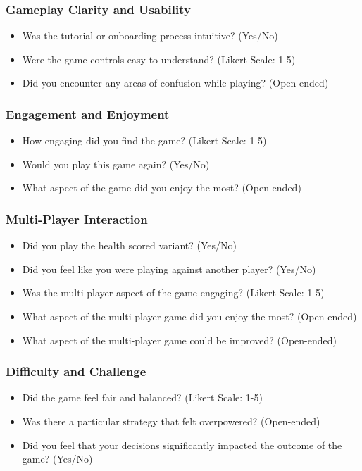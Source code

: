 \documentclass{article}
\begin{document}
\subsubsection{Gameplay Clarity and Usability}
\begin{itemize}
    \item Was the tutorial or onboarding process intuitive? (Yes/No)
    \item Were the game controls easy to understand? (Likert Scale: 1-5)
    \item Did you encounter any areas of confusion while playing? (Open-ended)
\end{itemize}

\subsubsection{Engagement and Enjoyment}
\begin{itemize}
    \item How engaging did you find the game? (Likert Scale: 1-5)
    \item Would you play this game again? (Yes/No)
    \item What aspect of the game did you enjoy the most? (Open-ended)
\end{itemize}

\subsubsection{Multi-Player Interaction}
\begin{itemize}
    \item Did you play the health scored variant? (Yes/No)
    \item Did you feel like you were playing against another player? (Yes/No)
    \item Was the multi-player aspect of the game engaging? (Likert Scale: 1-5)
    \item What aspect of the multi-player game did you enjoy the most? (Open-ended)
    \item What aspect of the multi-player game could be improved? (Open-ended)
\end{itemize}

\subsubsection{Difficulty and Challenge}
\begin{itemize}
    \item Did the game feel fair and balanced? (Likert Scale: 1-5)
    \item Was there a particular strategy that felt overpowered? (Open-ended)
    \item Did you feel that your decisions significantly impacted the outcome of the game? (Yes/No)
\end{itemize}
\end{document}
